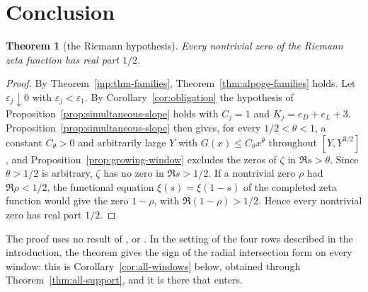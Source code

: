 \documentclass[10pt]{amsart}
\newtheorem{theorem}{Theorem}[section]
\theoremstyle{definition}
\theoremstyle{remark}
\begin{document}
\section{Conclusion}\label{sec:conclusion}
\begin{theorem}[the Riemann hypothesis]\label{thm:RH}
Every nontrivial zero of the Riemann zeta function has real part $1/2$.
\end{theorem}
\begin{proof}
By Theorem~\ref{inp:thm-families}, Theorem~\ref{thm:alpoge-families}
holds. Let $\varepsilon_j\downarrow0$ with $\varepsilon_j<\varepsilon_1$. By
Corollary~\ref{cor:obligation} the hypothesis of
Proposition~\ref{prop:simultaneous-slope} holds with $C_j=1$ and
$K_j=e_D+e_L+3$. Proposition~\ref{prop:simultaneous-slope} then gives, for
every $1/2<\theta<1$, a constant $C_\theta>0$ and arbitrarily large $Y$ with $G(x)\le C_\theta x^\theta$ throughout
$[Y,Y^{3/2}]$, and Proposition~\ref{prop:growing-window} excludes the zeros
of $\zeta$ in $\Re s>\theta$. Since $\theta>1/2$ is arbitrary, $\zeta$ has no
zero in $\Re s>1/2$. If a nontrivial zero $\rho$ had $\Re\rho<1/2$, the
functional equation $\xi(s)=\xi(1-s)$ of the completed zeta function would
give the zero $1-\rho$, with $\Re(1-\rho)>1/2$. Hence every nontrivial zero
has real part $1/2$.
\end{proof}
The proof uses no result of \cite{P43}, \cite{P44} or \cite{Paper45}. In
the setting of the four rows described in the introduction, the theorem gives
the sign of the radial intersection form on every window: this is
Corollary~\ref{cor:all-windows} below, obtained through
Theorem~\ref{thm:all-support}, and it is there that \cite{Paper45} enters.
\end{document}
